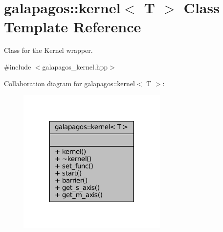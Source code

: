 \hypertarget{classgalapagos_1_1kernel}{}\section{galapagos\+:\+:kernel$<$ T $>$ Class Template Reference}
\label{classgalapagos_1_1kernel}


Class for the Kernel wrapper.  




{\ttfamily \#include $<$galapagos\+\_\+kernel.\+hpp$>$}



Collaboration diagram for galapagos\+:\+:kernel$<$ T $>$\+:
\nopagebreak
\begin{figure}[H]
\begin{center}
\leavevmode
\includegraphics[width=209pt]{classgalapagos_1_1kernel__coll__graph}
\end{center}
\end{figure}
